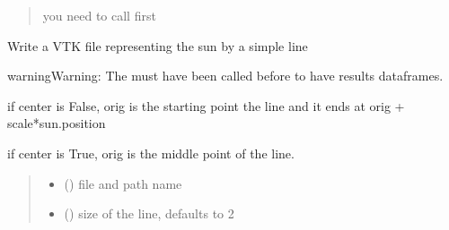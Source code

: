 \documentclass[letterpaper,10pt,english]{sphinxmanual}
\begin{document}
\begin{fulllineitems}
\begin{fulllineitems}
\begin{quote}
\begin{description}
\begin{itemize}
\end{itemize}

\sphinxAtStartPar
{} \textendash{} you need to call {\hyperref[\detokenize{reference:LVM.LightVegeManager.run}]{}} first

\end{description}\end{quote}

\end{fulllineitems}


\begin{fulllineitems}
\label{\detokenize{reference:LVM.LightVegeManager.VTK_sun}}
\pysigstartsignatures
{}
\pysigstopsignatures
\sphinxAtStartPar
Write a VTK file representing the sun by a simple line

\begin{sphinxadmonition}{warning}{Warning:}
\sphinxAtStartPar
The {\hyperref[\detokenize{reference:LVM.LightVegeManager.run}]{}} must have been called before to have results dataframes.
\end{sphinxadmonition}

\sphinxAtStartPar
if center is False, orig is the starting point the line and it ends at orig + scale*sun.position

\sphinxAtStartPar
if center is True, orig is the middle point of the line.
\begin{quote}\begin{description}
\begin{itemize}
\item {} 
\sphinxAtStartPar
{} () \textendash{} file and path name

\item {} 
\sphinxAtStartPar
{} (\sphinxstyleliteralemphasis{\sphinxupquote{, }}) \textendash{} size of the line, defaults to 2


\end{itemize}
\end{description}
\end{quote}
\end{fulllineitems}
\end{fulllineitems}
\end{document}
